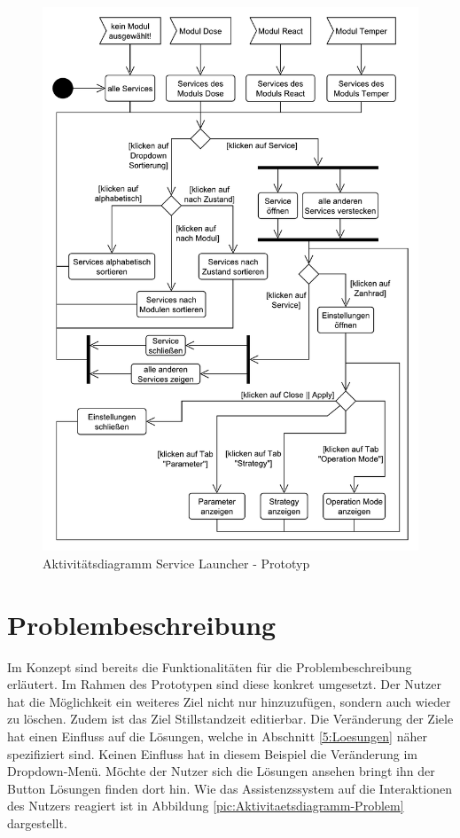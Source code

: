 \begin{figure}[htbp]
\centering
\includegraphics[scale=0.65]{DA_files/UML/Prototyp/Aktivitaetsdiagramm-ServiceLauchner.pdf}
\caption{Aktivitätsdiagramm Service Launcher - Prototyp}
\label{pic:Aktivitaetsdiagramm-ServiceLauncher}
\end{figure}

\section{Problembeschreibung}
\label{5:Problembeschreibung}
Im Konzept sind bereits die Funktionalitäten für die Problembeschreibung erläutert. Im Rahmen des Prototypen sind diese konkret umgesetzt. Der Nutzer hat die Möglichkeit ein weiteres Ziel nicht nur hinzuzufügen, sondern auch wieder zu löschen. Zudem ist das Ziel Stillstandzeit editierbar. Die Veränderung der Ziele hat einen Einfluss auf die Lösungen, welche in Abschnitt \ref{5:Loesungen} näher spezifiziert sind. Keinen Einfluss hat in diesem Beispiel die Veränderung im Dropdown-Menü. Möchte der Nutzer sich die Lösungen ansehen bringt ihn der Button Lösungen finden dort hin. Wie das Assistenzssystem auf die Interaktionen des Nutzers reagiert ist in Abbildung \ref{pic:Aktivitaetsdiagramm-Problem} dargestellt.

